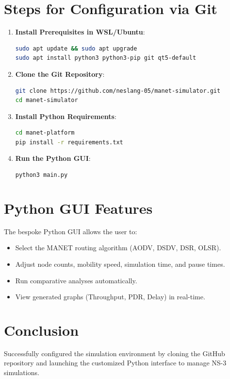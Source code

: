 \documentclass[12pt,a4paper]{report}
\begin{document}
\section{Steps for Configuration via Git}
\begin{enumerate}
    \item \textbf{Install Prerequisites in WSL/Ubuntu}:
\begin{lstlisting}[language=bash]
sudo apt update && sudo apt upgrade
sudo apt install python3 python3-pip git qt5-default
\end{lstlisting}

    \item \textbf{Clone the Git Repository}:
\begin{lstlisting}[language=bash]
git clone https://github.com/neslang-05/manet-simulator.git
cd manet-simulator
\end{lstlisting}

    \item \textbf{Install Python Requirements}:
\begin{lstlisting}[language=bash]
cd manet-platform
pip install -r requirements.txt
\end{lstlisting}

    \item \textbf{Run the Python GUI}:
\begin{lstlisting}[language=bash]
python3 main.py
\end{lstlisting}
\end{enumerate}

\section{Python GUI Features}
The bespoke Python GUI allows the user to:
\begin{itemize}
    \item Select the MANET routing algorithm (AODV, DSDV, DSR, OLSR).
    \item Adjust node counts, mobility speed, simulation time, and pause times.
    \item Run comparative analyses automatically.
    \item View generated graphs (Throughput, PDR, Delay) in real-time.
\end{itemize}

\section{Conclusion}
Successfully configured the simulation environment by cloning the GitHub repository and launching the customized Python interface to manage NS-3 simulations.
\end{document}
